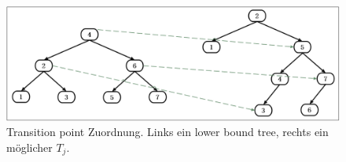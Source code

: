 \documentclass[a4paper,12pt]{article}
\begin{document}
\begin{figure}[h]
	\centering
	\includegraphics[width=1\textwidth]{"Medien/Tango/transitionPoints"}
	\caption{Transition point Zuordnung. Links ein lower bound tree, rechts ein möglicher $T_j$.   }
	\label{fig:transitionPoints}
\end{figure}
\end{document}
